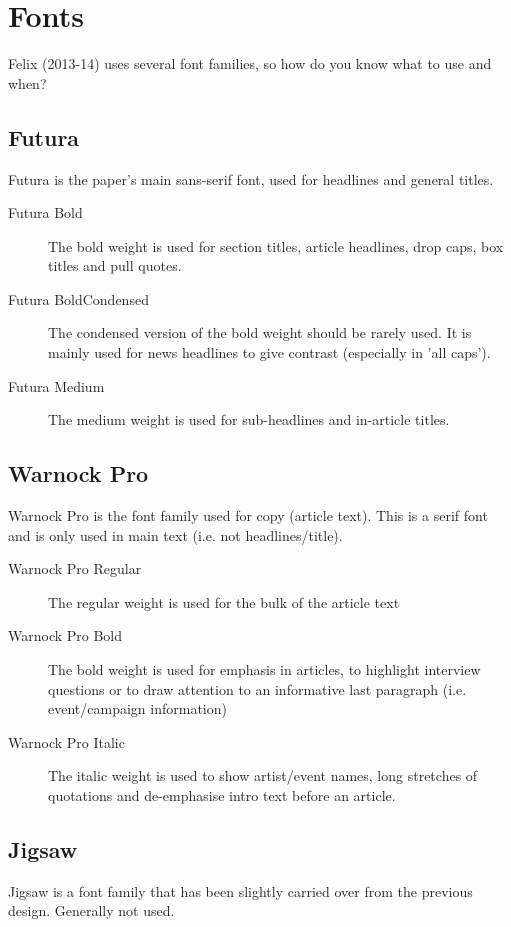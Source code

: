 \chapter{Fonts}

Felix (2013-14) uses several font families, so how do you know what to use and when?

\section{Futura}

Futura is the paper's main sans-serif font, used for headlines and general titles. 

\begin{description}
	\item[Futura Bold] The bold weight is used for section titles, article headlines, drop caps, box titles and pull quotes.
	\item[Futura BoldCondensed] The condensed version of the bold weight should be rarely used. It is mainly used for news headlines to give contrast (especially in 'all caps').
	\item[Futura Medium] The medium weight is used for sub-headlines and in-article titles. 
\end{description}

\section{Warnock Pro}

Warnock Pro is the font family used for copy (article text). This is a serif font and is only used in main text (i.e. not headlines/title).

\begin{description}
	\item[Warnock Pro Regular] The regular weight is used for the bulk of the article text
	\item[Warnock Pro Bold] The bold weight is used for emphasis in articles, to highlight interview questions or to draw attention to an informative last paragraph (i.e. event/campaign information)
	\item[Warnock Pro Italic] The italic weight is used to show artist/event names, long stretches of quotations and de-emphasise intro text before an article.
\end{description}

\section{Jigsaw}
 Jigsaw is a font family that has been slightly carried over from the previous design. Generally not used.


